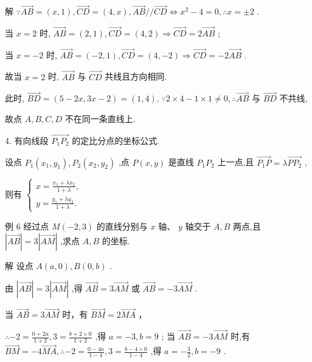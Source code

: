 \documentclass[10pt]{article}
\begin{document}
解 \(\because \overrightarrow{AB} = \left( {x,1}\right) ,\overrightarrow{CD} = \left( {4,x}\right) ,\overrightarrow{AB}//\overrightarrow{CD} \Leftrightarrow  {x}^{2} - 4 = 0,\therefore x =  \pm  2\) .

当 \(x = 2\) 时, \(\overrightarrow{AB} = \left( {2,1}\right) ,\overrightarrow{CD} = \left( {4,2}\right)  \Rightarrow  \overrightarrow{CD} = 2\overrightarrow{AB}\) ;

当 \(x =  - 2\) 时, \(\overrightarrow{AB} = \left( {-2,1}\right) ,\overrightarrow{CD} = \left( {4, - 2}\right)  \Rightarrow  \overrightarrow{CD} =  - 2\overrightarrow{AB}\) .

故当 \(x = 2\) 时, \(\overrightarrow{AB}\) 与 \(\overrightarrow{CD}\) 共线且方向相同.

此时, \(\overrightarrow{BD} = \left( {5 - {2x},{3x} - 2}\right)  = \left( {1,4}\right) .\;\because 2 \times  4 - 1 \times  1 \neq  0,\therefore \overrightarrow{AB}\) 与 \(\overrightarrow{BD}\) 不共线,

故点 \(A,B,C,D\) 不在同一条直线上.

4. 有向线段 \(\overrightarrow{{P}_{1}{P}_{2}}\) 的定比分点的坐标公式.

设点 \({P}_{1}\left( {{x}_{1},{y}_{1}}\right) ,{P}_{2}\left( {{x}_{2},{y}_{2}}\right)\) ,点 \(P\left( {x,y}\right)\) 是直线 \({P}_{1}{P}_{2}\) 上一点,且 \(\overrightarrow{{P}_{1}P} = \lambda \overrightarrow{P{P}_{2}}\) ,

则有 \(\left\{  \begin{array}{l} x = \frac{{x}_{1} + \lambda {x}_{2}}{1 + \lambda }, \\  y = \frac{{y}_{1} + \lambda {y}_{2}}{1 + \lambda }. \end{array}\right.\)

例 6 经过点 \(M\left( {-2,3}\right)\) 的直线分别与 \(x\) 轴、 \(y\) 轴交于 \(A,B\) 两点,且 \(\left| \overrightarrow{AB}\right|  = 3\left| \overrightarrow{AM}\right|\) ,求点 \(A,B\) 的坐标.

解 设点 \(A\left( {a,0}\right) ,B\left( {0,b}\right)\) .

由 \(\left| \overrightarrow{AB}\right|  = 3\left| \overrightarrow{AM}\right|\) ,得 \(\overrightarrow{AB} = 3\overrightarrow{AM}\) 或 \(\overrightarrow{AB} =  - 3\overrightarrow{AM}\) .

当 \(\overrightarrow{AB} = 3\overrightarrow{AM}\) 时，有 \(\overrightarrow{BM} = 2\overrightarrow{MA}\) ，

\(\therefore  - 2 = \frac{0 + {2a}}{1 + 2},3 = \frac{b + 2 \times  0}{1 + 2}\) ,得 \(a =  - 3,b = 9\) ; 当 \(\overrightarrow{AB} =  - 3\overrightarrow{AM}\) 时,有 \(\overrightarrow{BM} =  - 4\overrightarrow{MA},\therefore  - 2 = \frac{0 - {4a}}{1 - 4},3 = \frac{b - 4 \times  0}{1 - 4}\) ,得 \(a =  - \frac{3}{2},b =  - 9\) .
\end{document}
